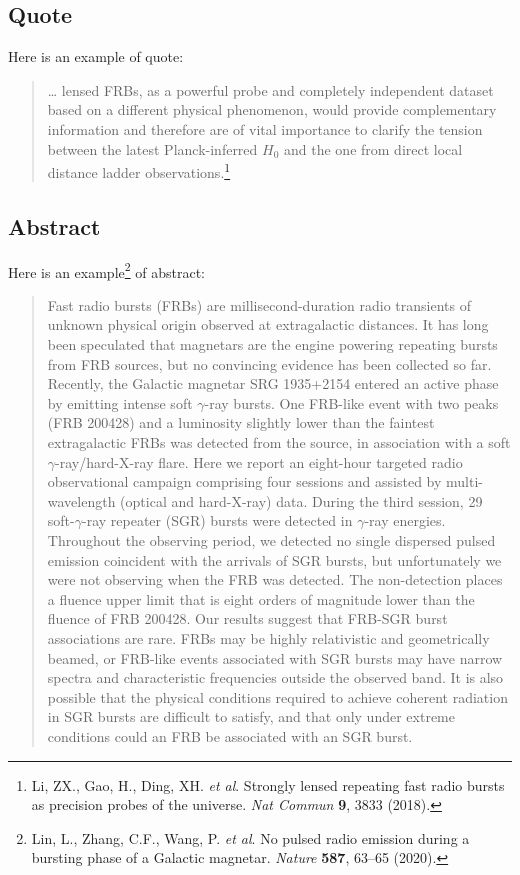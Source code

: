 \documentclass[a4paper,10pt]{article}
\begin{document}
    \subsection{Quote}
    Here is an example of quote:
    \begin{quote}
        \dots{} lensed FRBs, as a powerful probe and completely independent
        dataset based on a different physical phenomenon, would provide
        complementary information and therefore are of vital importance to
        clarify the tension between the latest Planck-inferred $H_0$ and the
        one from direct local distance ladder observations.\footnote{
            Li, ZX., Gao, H., Ding, XH. \textit{et al}. Strongly lensed
            repeating fast radio bursts as precision probes of the universe.
            \textit{Nat Commun} \textbf{9}, 3833 (2018).}
    \end{quote}
    \subsection{Abstract}
    Here is an example\footnote{
        Lin, L., Zhang, C.F., Wang, P. \textit{et al}.
        No pulsed radio emission during a bursting phase of a Galactic magnetar.
        \textit{Nature} \textbf{587}, 63--65 (2020).} of abstract:
    \begin{abstract}
        Fast radio bursts (FRBs) are millisecond-duration radio transients of
        unknown physical origin observed at extragalactic distances. It has
        long been speculated that magnetars are the engine powering repeating
        bursts from FRB sources, but no convincing evidence has been collected
        so far. Recently, the Galactic magnetar SRG 1935+2154 entered an active
        phase by emitting intense soft $\gamma$-ray bursts. One FRB-like event
        with two peaks (FRB 200428) and a luminosity slightly lower than the
        faintest extragalactic FRBs was detected from the source, in
        association with a soft $\gamma$-ray/hard-X-ray flare. Here we report
        an eight-hour targeted radio observational campaign comprising four
        sessions and assisted by multi-wavelength (optical and hard-X-ray)
        data. During the third session, 29 soft-$\gamma$-ray repeater (SGR)
        bursts were detected in $\gamma$-ray energies. Throughout the observing
        period, we detected no single dispersed pulsed emission coincident with
        the arrivals of SGR bursts, but unfortunately we were not observing
        when the FRB was detected. The non-detection places a fluence upper
        limit that is eight orders of magnitude lower than the fluence of FRB
        200428. Our results suggest that FRB-SGR burst associations are rare.
        FRBs may be highly relativistic and geometrically beamed, or FRB-like
        events associated with SGR bursts may have narrow spectra and
        characteristic frequencies outside the observed band. It is also
        possible that the physical conditions required to achieve coherent
        radiation in SGR bursts are difficult to satisfy, and that only under
        extreme conditions could an FRB be associated with an SGR burst.
    \end{abstract}
    \newpage
\end{document}
